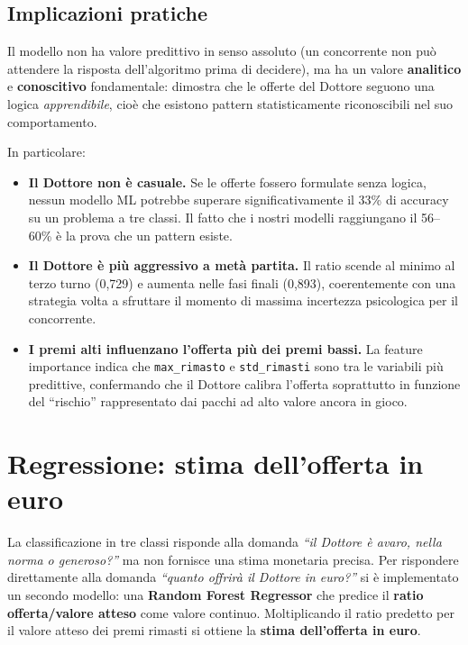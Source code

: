 \documentclass[12pt, a4paper]{article}
\begin{document}
\subsection{Implicazioni pratiche}

Il modello non ha valore predittivo in senso assoluto (un concorrente non può
attendere la risposta dell'algoritmo prima di decidere), ma ha un valore
\textbf{analitico} e \textbf{conoscitivo} fondamentale: dimostra che le offerte
del Dottore seguono una logica \textit{apprendibile}, cioè che esistono pattern
statisticamente riconoscibili nel suo comportamento.

In particolare:

\begin{itemize}
  \item \textbf{Il Dottore non è casuale.} Se le offerte fossero formulate
        senza logica, nessun modello ML potrebbe superare significativamente il
        33\% di accuracy su un problema a tre classi. Il fatto che i nostri
        modelli raggiungano il 56--60\% è la prova che un pattern esiste.
  \item \textbf{Il Dottore è più aggressivo a metà partita.} Il ratio scende
        al minimo al terzo turno (0,729) e aumenta nelle fasi finali
        (0,893), coerentemente con una strategia volta a sfruttare il momento
        di massima incertezza psicologica per il concorrente.
  \item \textbf{I premi alti influenzano l'offerta più dei premi bassi.}
        La feature importance indica che \texttt{max\_rimasto} e \texttt{std\_rimasti}
        sono tra le variabili più predittive, confermando che il Dottore calibra
        l'offerta soprattutto in funzione del ``rischio'' rappresentato dai
        pacchi ad alto valore ancora in gioco.
\end{itemize}

\section{Regressione: stima dell'offerta in euro}

La classificazione in tre classi risponde alla domanda
\textit{``il Dottore è avaro, nella norma o generoso?''}
ma non fornisce una stima monetaria precisa. Per rispondere direttamente
alla domanda \textit{``quanto offrirà il Dottore in euro?''} si è
implementato un secondo modello: una \textbf{Random Forest Regressor}
che predice il \textbf{ratio offerta/valore atteso} come valore
continuo. Moltiplicando il ratio predetto per il valore atteso dei
premi rimasti si ottiene la \textbf{stima dell'offerta in euro}.
\end{document}

